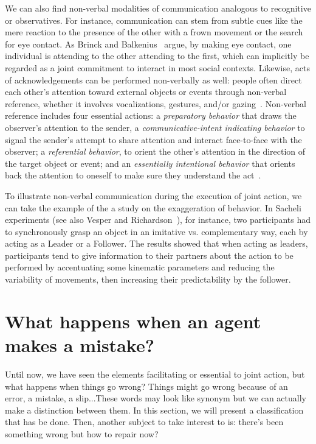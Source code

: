 \documentclass[a4paper,11pt,twoside]{StyleThese}
\begin{document}
We can also find non-verbal modalities of communication analogous to recognitive or observatives. For instance, communication can stem from subtle cues like the mere reaction to the presence of the other with a frown movement or the search for eye contact. As Brinck and Balkenius~\cite{brinck_2018_mutual} argue, by making eye contact, one individual is attending to the other attending to the first, which can implicitly be regarded as a joint commitment to interact in most social contexts. Likewise, acts of acknowledgements can be performed non-verbally as well: people often direct each other's attention toward external objects or events through non-verbal reference, whether it involves vocalizations, gestures, and/or gazing~\cite{bates_1979_emergence, leavens_2004_referential, brinck_2008_role}. Non-verbal reference includes four essential actions: a \emph{preparatory behavior} that draws the observer’s attention to the sender, a \emph{communicative-intent indicating behavior} to signal the sender’s attempt to share attention and interact face-to-face with the observer; a \emph{referential behavior}, to orient the other’s attention in the direction of the target object or event; and an \emph{essentially intentional behavior} that orients back the attention to oneself to make sure they understand the act~\cite[p.~122-123]{brinck_2008_role}.

To illustrate non-verbal communication during the execution of joint action, we can take the example of the a study on the exaggeration of behavior. In Sacheli \etal{} experiments (see also Vesper and Richardson~\cite{vesper_2014_strategic}), for instance, two participants had to synchronously grasp an object in an imitative vs. complementary way, each by acting as a Leader or a Follower. The results showed that when acting as leaders, participants tend to give information to their partners about the action to be performed by accentuating some kinematic parameters and reducing the variability of movements, then increasing their predictability by the follower. 



\section{What happens when an agent makes a mistake?}\label{chap1:sec:failures}
Until now, we have seen the elements facilitating or essential to joint action, but what happens when things go wrong? Things might go wrong because of an error, a mistake, a slip...These words may look like synonym but we can actually make a distinction between them. In this section, we will present a classification that has be done. Then, another subject to take interest to is: there's been something wrong but how to repair now?
\end{document}
